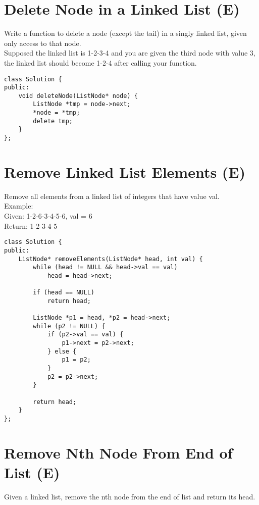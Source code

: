 \section{Delete Node in a Linked List (E)}
Write a function to delete a node (except the tail) in a singly linked list, given only access to that node.\\

Supposed the linked list is 1-2-3-4 and you are given the third node with value 3, the linked list should become 1-2-4 after calling your function. \\

\begin{lstlisting}
class Solution {
public:
    void deleteNode(ListNode* node) {
        ListNode *tmp = node->next;
        *node = *tmp;
        delete tmp;
    }
};
\end{lstlisting} 


\section{Remove Linked List Elements (E)}
Remove all elements from a linked list of integers that have value val.\\

Example:\\
Given: 1-2-6-3-4-5-6, val = 6\\
Return: 1-2-3-4-5 \\

\begin{lstlisting}
class Solution {
public:
    ListNode* removeElements(ListNode* head, int val) {
        while (head != NULL && head->val == val)
            head = head->next;
            
        if (head == NULL)
            return head;
        
        ListNode *p1 = head, *p2 = head->next;
        while (p2 != NULL) {
            if (p2->val == val) {
                p1->next = p2->next;
            } else {
                p1 = p2;
            }
            p2 = p2->next;
        }
        
        return head;
    }
};
\end{lstlisting}


\section{Remove Nth Node From End of List (E)}
Given a linked list, remove the nth node from the end of list and return its head.\\

